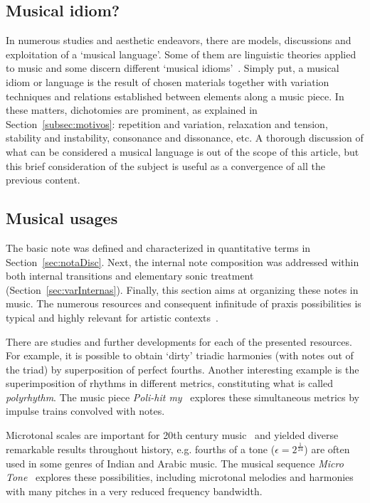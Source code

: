 \subsection{Musical idiom?}
In numerous studies and aesthetic endeavors, there are models, discussions and exploitation of a `musical language'.
Some of them are linguistic theories applied to music
and some discern different `musical
idioms'~\cite{Lerdahl, Harmonia, Salzer,Alfaix}. Simply put, a musical idiom or language
is the result of chosen materials together with variation techniques and
relations established between elements along a music piece. In these matters,
dichotomies are prominent, as explained in Section~\ref{subsec:motivos}:
repetition and variation, relaxation and tension, stability and instability, consonance and dissonance, etc.
A thorough discussion of what can be considered a musical language is out of the scope of this article, but this brief consideration of the subject is useful as a convergence of all the previous content.

\subsection{Musical usages}\label{subsec:usosmusicais3}
The basic note was defined and characterized in quantitative terms in Section~\ref{sec:notaDisc}.
Next, the internal note
composition was addressed within both internal transitions and elementary sonic treatment
(Section~\ref{sec:varInternas}). Finally, this section aims at organizing these notes in music. The numerous resources and consequent infinitude
of praxis possibilities is typical and highly relevant for artistic contexts~\cite{Harmonia,Webern}.

There are studies and further developments for each of the presented resources.
For example, it is possible to obtain `dirty' triadic harmonies (with notes out of the triad) by superposition of perfect fourths.
Another interesting example is the superimposition of rhythms in different metrics, constituting what is
called \emph{polyrhythm}. The music piece \emph{Poli-hit my}~\cite{MASSA} explores these simultaneous metrics by impulse trains convolved with notes.

Microtonal scales are important for 20th
century music~\cite{microtonalidade} and yielded diverse remarkable results throughout history, e.g.
fourths of a tone ($\epsilon=2^{\frac{1}{24}}$) are often used in some genres of Indian and Arabic music.
The musical sequence \emph{Micro Tone}~\cite{MASSA} explores these possibilities,
including microtonal melodies and harmonies
with many pitches in a very reduced frequency bandwidth.


